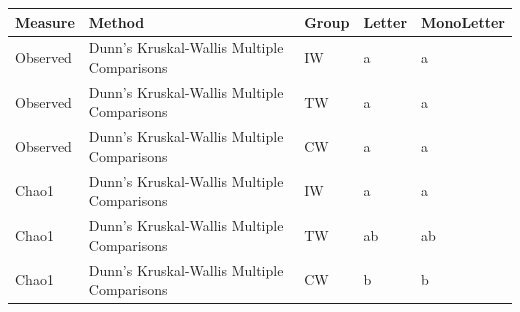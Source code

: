 \documentclass[
]{book}
\newenvironment{Shaded}{\begin{snugshade}}{\end{snugshade}}
\newcommand{\AttributeTok}[1]{\textcolor[rgb]{0.13,0.29,0.53}{#1}}
\newcommand{\CommentTok}[1]{\textcolor[rgb]{0.56,0.35,0.01}{\textit{#1}}}
\newcommand{\ConstantTok}[1]{\textcolor[rgb]{0.56,0.35,0.01}{#1}}
\newcommand{\FunctionTok}[1]{\textcolor[rgb]{0.13,0.29,0.53}{\textbf{#1}}}
\newcommand{\NormalTok}[1]{#1}
\newcommand{\SpecialCharTok}[1]{\textcolor[rgb]{0.81,0.36,0.00}{\textbf{#1}}}
\newcommand{\StringTok}[1]{\textcolor[rgb]{0.31,0.60,0.02}{#1}}
\newcounter{none} %
\begin{document}
{\def\LTcaptype{none} %
\begin{longtable}[]{@{}
  >{\centering\arraybackslash}p{}
  >{\centering\arraybackslash}p{}
  >{\centering\arraybackslash}p{}
  >{\centering\arraybackslash}p{}
  >{\centering\arraybackslash}p{}@{}}
\toprule\noalign{}
\begin{minipage}[b]{\linewidth}\centering
Measure
\end{minipage} & \begin{minipage}[b]{\linewidth}\centering
Method
\end{minipage} & \begin{minipage}[b]{\linewidth}\centering
Group
\end{minipage} & \begin{minipage}[b]{\linewidth}\centering
Letter
\end{minipage} & \begin{minipage}[b]{\linewidth}\centering
MonoLetter
\end{minipage} \\
\midrule\noalign{}
\endhead
\bottomrule\noalign{}
\endlastfoot
Observed & Dunn's Kruskal-Wallis Multiple
Comparisons & IW & a & a \\
Observed & Dunn's Kruskal-Wallis Multiple
Comparisons & TW & a & a \\
Observed & Dunn's Kruskal-Wallis Multiple
Comparisons & CW & a & a \\
Chao1 & Dunn's Kruskal-Wallis Multiple
Comparisons & IW & a & a \\
Chao1 & Dunn's Kruskal-Wallis Multiple
Comparisons & TW & ab & ab \\
Chao1 & Dunn's Kruskal-Wallis Multiple
Comparisons & CW & b & b \\
\end{longtable}
}

\begin{Shaded}
\end{Shaded}
\end{document}
